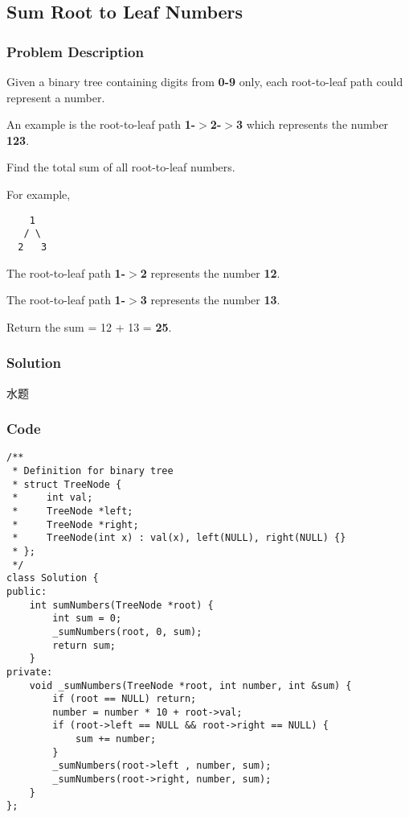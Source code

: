 \documentclass[courier]{article}
\begin{document}
\begin{CJK*}{UTF8}{gkai}
\subsection{ Sum Root to Leaf Numbers }

\subsubsection*{Problem Description}
Given a binary tree containing digits from \textbf{0-9} only, each root-to-leaf path could represent a number.

An example is the root-to-leaf path \textbf{1-$>$2-$>$3} which represents the number \textbf{123}.

Find the total sum of all root-to-leaf numbers.

For example,
\begin{verbatim}
    1
   / \
  2   3
\end{verbatim}

The root-to-leaf path \textbf{1-$>$2} represents the number \textbf{12}.


The root-to-leaf path \textbf{1-$>$3} represents the number \textbf{13}.

Return the sum = 12 + 13 = \textbf{25}.



\subsubsection*{Solution}
水题

\subsubsection*{Code}
\begin{lstlisting}
/**
 * Definition for binary tree
 * struct TreeNode {
 *     int val;
 *     TreeNode *left;
 *     TreeNode *right;
 *     TreeNode(int x) : val(x), left(NULL), right(NULL) {}
 * };
 */
class Solution {
public:
    int sumNumbers(TreeNode *root) {
        int sum = 0;
        _sumNumbers(root, 0, sum);
        return sum;
    }
private:
    void _sumNumbers(TreeNode *root, int number, int &sum) {
        if (root == NULL) return;
        number = number * 10 + root->val;
        if (root->left == NULL && root->right == NULL) {
            sum += number;
        }
        _sumNumbers(root->left , number, sum);
        _sumNumbers(root->right, number, sum);
    }
}; 
\end{lstlisting}



\end{CJK*}
\end{document}
